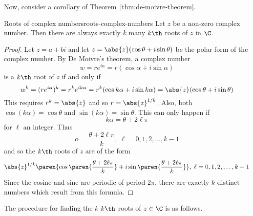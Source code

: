 Now, consider a corollary of Theorem~\ref{thm:de-moivre-theorem}.

\begin{corollary}{Roots of complex numbers}{roots-complex-numbers}
Let $z$ be a non-zero complex number.
Then there are always exactly $k$ many  $k\th$
roots of $z$ in $\C$.
\end{corollary}

\begin{proof}
Let $z=a+bi$ and let $z=\abs{z}(\cos
\theta+i\sin \theta) $ be the polar form of the complex number. By De Moivre's
theorem, a complex number
\begin{equation*}
w= r e^{i \alpha} = r(\cos \alpha +i\sin \alpha)
\end{equation*}
is a $k\th$ root of $z$ if and only if
\begin{equation*}
w^k = (r e^{i \alpha})^k = r^k e^{ik\alpha} = r^{k}(\cos k\alpha +i\sin k\alpha) =\abs{z}(\cos \theta+i\sin \theta)
\end{equation*}
This requires $r^{k}=\abs{z}$ and so $r=\abs{z}^{1/k}$. Also, both $\cos (k\alpha) =\cos \theta$ and
$\sin (k\alpha) =\sin \theta$. This can only happen if
\begin{equation*}
k\alpha =\theta+2 \ell \pi
\end{equation*}
for $\ell$ an integer. Thus
\begin{equation*}
\alpha =
\frac{\theta+2 \ell \pi }{k},\; \ell = 0, 1, 2,\ldots, k-1
\end{equation*}
and so the $k\th$ roots of $z$ are of the form
\begin{equation*}
\abs{z}^{1/k}\paren{\cos \paren{\frac{\theta+2 \ell \pi }{k}}
+i\sin \paren{\frac{\theta+2 \ell \pi }{k}}} ,\;\ell = 0, 1, 2,\ldots, k-1
\end{equation*}
Since the cosine and sine are periodic of period $2\pi$, there are exactly $
k$ distinct numbers which result from this formula.
\end{proof}

The procedure for finding the $k$ $k\th$ roots of $z \in \C$ is as follows.

